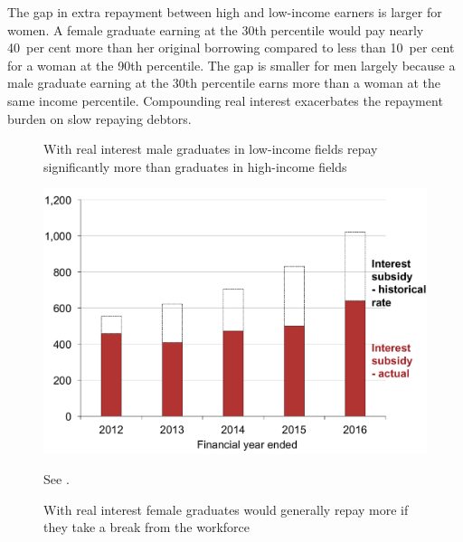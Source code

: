 \documentclass{grattan}
\begin{document}
The gap in extra repayment between high and low-income earners is larger for women.
A female graduate earning at the 30{th} percentile would pay nearly 40~per cent more than her original borrowing compared to less than 10~per cent for a woman at the 90{th} percentile.
The gap is smaller for men largely because a male graduate earning at the 30{th} percentile earns more than a woman at the same income percentile.
Compounding real interest exacerbates the repayment burden on slow repaying debtors.


\begin{figure}
\begin{minipage}[t][\textheight]{\columnwidth}
\vspace{\grattanfptop}
\caption{With real interest male graduates in low-income fields repay significantly more than graduates in high-income fields}\label{fig:fig14-when-real-interest-imposed-many-low-income-grads-pay-signif-more-than-high-income-grads}


\includegraphics[page=14]{atlas/Chartpack.pdf}

%
{See .}
\end{minipage}
\hfill 
\begin{minipage}[t][\textheight]{\columnwidth}
\vspace{\grattanfptop}
\caption{With real interest female graduates would generally repay more if they take a break from the workforce}\label{fig:fig15-with-real-interest-female-grads-would-repay-more-if-they-took-break-from-workforce}


\end{minipage}
\end{figure}
\end{document}
